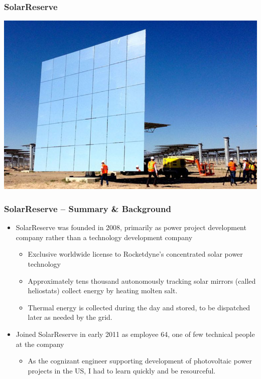 \documentclass[aspectratio=169]{beamer}
\begin{document}
\begin{frame}
  \frametitle{SolarReserve}
  \center
  \includegraphics[width=.7\linewidth]{HeliostatImage.jpeg}
\end{frame}

\begin{frame}
  \frametitle{SolarReserve -- Summary \& Background}
  \begin{itemize}
  \item SolarReserve was founded in 2008, primarily as power project development company rather than a technology development company
    \begin{itemize}
    \item Exclusive worldwide license to Rocketdyne's concentrated
      solar power technology
    \item Approximately tens thousand autonomously tracking solar
      mirrors (called heliostats) collect energy by heating molten
      salt.
    \item Thermal energy is collected during the day and stored, to
      be dispatched later as needed by the grid.
    \end{itemize}
  \item Joined SolarReserve in early 2011 as employee 64, one
    of few technical people at the company
    \begin{itemize}
    \item As the cognizant engineer supporting development of
      photovoltaic power projects in the US, I had to learn quickly and be resourceful. %
      \end{itemize}
  \end{itemize}
\end{frame}
 
\end{document}
